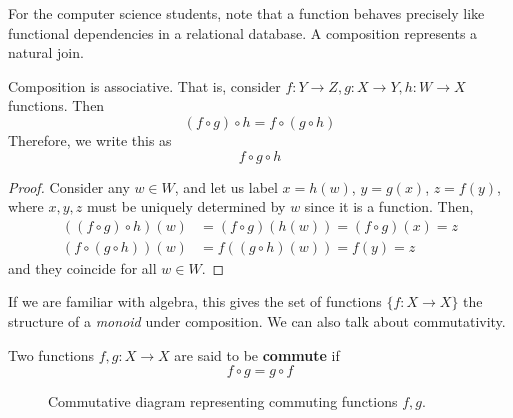 \documentclass{article}
\begin{document}
    For the computer science students, note that a function behaves precisely like functional dependencies in a relational database. A composition represents a natural join. 

    \begin{theorem}[Associativity]
      Composition is associative. That is, consider $f: Y \rightarrow Z, g: X \rightarrow Y, h: W \rightarrow X$ functions. Then 
      \begin{equation}
        (f \circ g) \circ h = f \circ (g \circ h)
      \end{equation} 
      Therefore, we write this as 
      \begin{equation}
        f \circ g \circ h
      \end{equation} 
      \begin{figure}[H]
        \centering 
        \caption{} 
        \label{fig:associative}
      \end{figure}
    \end{theorem}
    \begin{proof}
      Consider any $w \in W$, and let us label $x = h(w)$, $y = g(x)$, $z = f(y)$, where $x, y, z$ must be uniquely determined by $w$ since it is a function. Then, 
      \begin{align}
        ((f \circ g) \circ h) (w) & = (f \circ g) (h(w)) = (f \circ g) (x) = z  \\
        (f \circ (g \circ h)) (w) & = f ((g \circ h)(w)) = f (y) = z
      \end{align}
      and they coincide for all $w \in W$. 
    \end{proof} 

    If we are familiar with algebra, this gives the set of functions $\{f: X \rightarrow X\}$ the structure of a \textit{monoid} under composition. We can also talk about commutativity. 

    \begin{definition}[Commutativity]
      Two functions $f, g: X \rightarrow X$ are said to be \textbf{commute} if 
      \begin{equation}
        f \circ g = g \circ f
      \end{equation} 
      \begin{figure}[H]
        \centering 
        \caption{Commutative diagram representing commuting functions $f, g$. } 
        \label{fig:commutative}
      \end{figure}
    \end{definition}
\end{document}
